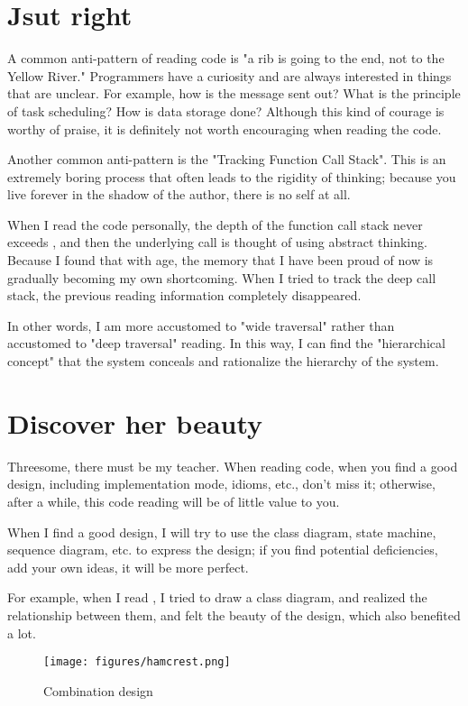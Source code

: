 \section{Jsut right}
\begin{content}
A common anti-pattern of reading code is "a rib is going to the end, not to the Yellow River." Programmers have a curiosity and are always interested in things that are unclear. For example, how is the message sent out? What is the principle of task scheduling? How is data storage done? Although this kind of courage is worthy of praise, it is definitely not worth encouraging when reading the code.

Another common anti-pattern is the "Tracking Function Call Stack". This is an extremely boring process that often leads to the rigidity of thinking; because you live forever in the shadow of the author, there is no self at all.

When I read the code personally, the depth of the function call stack never exceeds , and then the underlying call is thought of using abstract thinking. Because I found that with age, the memory that I have been proud of now is gradually becoming my own shortcoming. When I tried to track the deep call stack, the previous reading information completely disappeared.

In other words, I am more accustomed to "wide traversal" rather than accustomed to "deep traversal" reading. In this way, I can find the "hierarchical concept" that the system conceals and rationalize the hierarchy of the system.
\end{content}


\section{Discover her beauty}
\begin{content}
Threesome, there must be my teacher. When reading code, when you find a good design, including implementation mode, idioms, etc., don't miss it; otherwise, after a while, this code reading will be of little value to you.

When I find a good design, I will try to use the class diagram, state machine, sequence diagram, etc. to express the design; if you find potential deficiencies, add your own ideas, it will be more perfect.

For example, when I read , I tried to draw a class diagram, and realized the relationship between them, and felt the beauty of the design, which also benefited a lot.

\begin{figure}[!h]
  \centering
  \texttt{[image: figures/hamcrest.png]}
  \caption{Combination design}
  \label{fig:hamcrest}
\end{figure}
\end{content}


